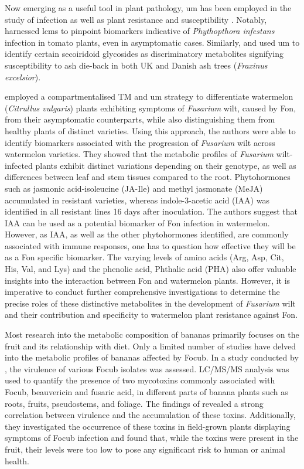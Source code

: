 Now emerging as a useful tool in plant pathology, \ac{um} has been employed in the study of infection as well as plant resistance and susceptibility \parencite{Allwood2021}. Notably, \textcite{Garcia2018} harnessed \ac{lcms} to pinpoint biomarkers indicative of \textit{Phythopthora infestans} infection in tomato plants, even in asymptomatic cases. Similarly, \textcite{Sambles2017} and \textcite{Sidda2020} used \ac{um} to identify certain secoiridoid glycosides as discriminatory metabolites signifying susceptibility to ash die-back in both UK and Danish ash trees (\textit{Fraxinus excelsior}).

\textcite{Kasote2020} employed a compartmentalised TM and \ac{um} strategy to differentiate watermelon (\textit{Citrullus vulgaris}) plants exhibiting symptoms of \textit{Fusarium} wilt, caused by \ac{Fon}, from their asymptomatic counterparts, while also distinguishing them from healthy plants of distinct varieties. Using this approach, the authors were able to identify biomarkers associated with the progression of \textit{Fusarium} wilt across watermelon varieties. They showed that the metabolic profiles of \textit{Fusarium} wilt-infected plants exhibit distinct variations depending on their genotype, as well as differences between leaf and stem tissues compared to the root. Phytohormones such as jasmonic acid-isoleucine (JA-Ile) and methyl jasmonate (MeJA) accumulated in resistant varieties, whereas indole-3-acetic acid (IAA) was identified in all resistant lines 16 days after inoculation. The authors suggest that IAA can be used as a potential biomarker of \ac{Fon} infection in watermelon. However, as IAA, as well as the other phytohormones identified,  are commonly associated with immune responses, one has to question how effective they will be as a \ac{Fon} specific biomarker. The varying levels of amino acids (Arg, Asp, Cit, His, Val, and Lys) and the phenolic acid, Phthalic acid (PHA) also offer valuable insights into the interaction between \ac{Fon} and watermelon plants. However, it is imperative to conduct further comprehensive investigations to determine the precise roles of these distinctive metabolites in the development of \textit{Fusarium} wilt and their contribution and specificity to watermelon plant resistance against \ac{Fon}.

Most research into the metabolic composition of bananas primarily focuses on the fruit and its relationship with diet. Only a limited number of studies have delved into the metabolic profiles of bananas affected by \ac{Focub}. In a study conducted by \textcite{Li2013c}, the virulence of various \ac{Focub} isolates was assessed. LC/MS/MS analysis was used to quantify the presence of two mycotoxins commonly associated with \ac{Focub}, beauvericin and fusaric acid, in different parts of banana plants such as roots, fruits, pseudostems, and foliage. The findings of \textcite{Li2013c} revealed a strong correlation between virulence and the accumulation of these toxins. Additionally, they investigated the occurrence of these toxins in field-grown plants displaying symptoms of \ac{Focub} infection and found that, while the toxins were present in the fruit, their levels were too low to pose any significant risk to human or animal health.

